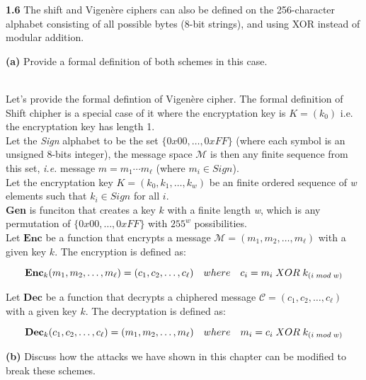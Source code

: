 \vspace{1em}
\noindent
\textbf{1.6} \hspace{1em} The shift and Vigenère ciphers can also be defined on the 256-character
alphabet consisting of all possible bytes (8-bit strings), and using XOR
instead of modular addition.\\[0.5em]
\hspace*{0.0em}\parbox[t]{\dimexpr\linewidth-3.0em}{
	\textbf{(a)} Provide a formal definition of both schemes in this case.
}\\[0.5em]


Let's provide the formal defintion of Vigenère cipher. The formal definition of Shift chipher is a special case of it where the encryptation key is  \( K = (k_0)\) i.e. the encryptation key has length 1.\\

Let the \textit{Sign} alphabet to  be the set \(\{0x00, \dots, 0xFF\}\) (where each symbol is an unsigned 8-bits integer), the message space 
\( \mathcal{M} \) is then any finite sequence from this set, \textit{i.e.} message \( m = m_1 \cdots m_\ell \) (where \( m_i \in Sign \)).\\

Let the encryptation key \( K = (k_0, k_1, \dots, k_{w}) \) be an finite ordered sequence of \textit{w} elements such that \( k_i \in Sign \) for all \( i \).\\

\textbf{Gen} is funciton that creates a key \( k \) with a finite length \textit{w}, which is any permutation of \( \{0x00, \dots, 0xFF\} \) with \( 255^w \) possibilities.\\

Let \(\textbf{Enc}\) be a function that encrypts a message \( \mathcal{M} = (m_1, m_2, \dots, m_\ell) \) with a given key \( k \). The encryption is defined as:

\[
\textbf{Enc\( _k\)}(m_1, m_2, \dots, m_\ell) = (c_1, c_2, \dots, c_\ell) \quad where \quad c_i = m_i \; XOR \; k_{(i \; mod \; w)}
\]

Let \(\textbf{Dec}\) be a function that decrypts a chiphered message \( \mathcal{C} = (c_1, c_2, \dots, c_\ell) \) with a given key \( k \). The decryptation is defined as:

\[
\textbf{Dec\( _k\)}(c_1, c_2, \dots, c_\ell) = (m_1, m_2, \dots, m_\ell) \quad where \quad m_i = c_i \; XOR \; k_{(i \; mod \; w)}
\]


\vspace{1em}
\noindent
\hspace*{0.0em}\parbox[t]{\dimexpr\linewidth-3.0em}{
	\textbf{(b)} Discuss how the attacks we have shown in this chapter can be
	modified to break these schemes.
}
\vspace{1em}

